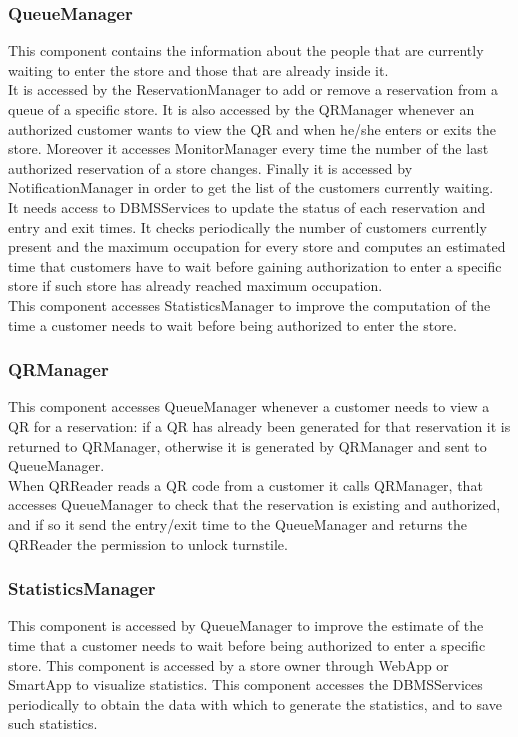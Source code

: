 \subsubsection{QueueManager}
This component contains the information about the people that are currently waiting to enter the store and those that are already inside it.\\
It is accessed by the ReservationManager to add or remove a reservation from a queue of a specific store.
It is also accessed by the QRManager whenever an authorized customer wants to view the QR and when he/she enters or exits the store.
Moreover it accesses MonitorManager every time the number of the last authorized reservation of a store changes.
Finally it is accessed by NotificationManager in order to get the list of the customers currently waiting.\\
It needs access to DBMSServices to update the status of each reservation and entry and exit times. It checks periodically the number of customers currently present and the maximum occupation for every store and computes an estimated time that customers have to wait before gaining authorization to enter a specific store if such store has already reached maximum occupation.\\
This component accesses StatisticsManager to improve the computation of the time a customer needs to wait before being authorized to enter the store.
\subsubsection{QRManager}
This component accesses QueueManager whenever a customer needs to view a QR for a reservation: if a QR has already been generated for that reservation it is returned to QRManager, otherwise it is generated by QRManager and sent to QueueManager.\\ When QRReader reads a QR code from a customer it calls QRManager, that accesses QueueManager to check that the reservation is existing and authorized, and if so it send the entry/exit time to the QueueManager and returns the QRReader the permission to unlock turnstile.
\subsubsection{StatisticsManager}
This component is accessed by QueueManager to improve the estimate of the time that a customer needs to wait before being authorized to enter a specific store. This component is accessed by a store owner through WebApp or SmartApp to visualize statistics. This component accesses the DBMSServices periodically to obtain the data with which to generate the statistics, and to save such statistics.
